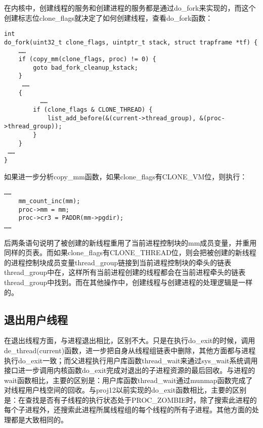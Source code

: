 在内核中，创建线程的服务和创建进程的服务都是通过do\_fork来实现的，而这个创建标志位clone\_flags就决定了如何创建线程，查看do\_fork函数：

\begin{lstlisting}
int
do_fork(uint32_t clone_flags, uintptr_t stack, struct trapframe *tf) {
    ……
    if (copy_mm(clone_flags, proc) != 0) {
        goto bad_fork_cleanup_kstack;
    }
     ……
    {
          ……
        if (clone_flags & CLONE_THREAD) {
            list_add_before(&(current->thread_group), &(proc->thread_group));
        }
    }
 ……
}
\end{lstlisting}

如果进一步分析copy\_mm函数，如果clone\_flags有CLONE\_VM位，则执行：

\begin{lstlisting}
……
    mm_count_inc(mm);
    proc->mm = mm;
    proc->cr3 = PADDR(mm->pgdir);
……
\end{lstlisting}

后两条语句说明了被创建的新线程重用了当前进程控制块的mm成员变量，并重用同样的页表。而如果clone\_flags有CLONE\_THREAD位，则会把被创建的新线程的进程控制块成员变量thread\_group链接到当前进程控制块的牵头的链表thread\_group中在，这样所有当前进程创建的线程都会在当前进程牵头的链表thread\_group中找到。而在其他操作中，创建线程与创建进程的处理逻辑是一样的。

\subsection{退出用户线程}\label{ux9000ux51faux7528ux6237ux7ebfux7a0b}

在退出线程方面，与进程退出相比，区别不大。只是在执行do\_exit的时候，调用de\_thread(current)函数，进一步把自身从线程组链表中删除，其他方面都与进程执行do\_exit一致；而父进程执行用户库函数thread\_wait来通过sys\_wait系统调用接口进一步调用内核函数do\_exit完成对退出的子进程资源的最后回收。与进程的wait函数相比，主要的区别是：用户库函数thread\_wait通过munmap函数完成了对线程用户栈空间的回收。与proj12以前实现的do\_exit函数相比，主要的区别是：在查找是否有子线程的执行状态处于PROC\_ZOMBIE时，除了搜索此进程的每个子进程外，还搜索此进程所属线程组的每个线程的所有子进程。其他方面的处理都是大致相同的。
